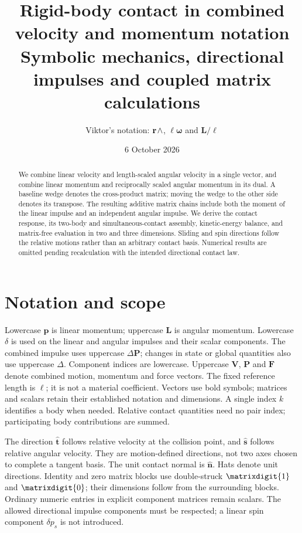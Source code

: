 \documentclass[11pt,a4paper]{article}
\title{Rigid-body contact in combined velocity and momentum notation\\\large Symbolic mechanics, directional impulses and coupled matrix calculations}
\author{Viktor's notation: $\mathord{\mathbf{r}\mkern2mu\wedge}$, $\ell\boldsymbol{\omega}$ and $\mathbf{L}/\ell$}
\date{6 October 2026}
\newcommand{\id}{\matrixdigit{1}}
\newcommand{\zmat}{\matrixdigit{0}}
\begin{document}
\maketitle
\begin{abstract}
We combine linear velocity and length-scaled angular velocity in a single vector, and combine linear momentum and reciprocally scaled angular momentum in its dual. A baseline wedge denotes the cross-product matrix; moving the wedge to the other side denotes its transpose. The resulting additive matrix chains include both the moment of the linear impulse and an independent angular impulse. We derive the contact response, its two-body and simultaneous-contact assembly, kinetic-energy balance, and matrix-free evaluation in two and three dimensions. Sliding and spin directions follow the relative motions rather than an arbitrary contact basis. Numerical results are omitted pending recalculation with the intended directional contact law.
\end{abstract}

\section{Notation and scope}
Lowercase $\mathbf{p}$ is linear momentum; uppercase $\mathbf{L}$ is angular momentum. Lowercase $\delta$ is used on the linear and angular impulses and their scalar components. The combined impulse uses uppercase $\Delta\mathbf{P}$; changes in state or global quantities also use uppercase $\Delta$. Component indices are lowercase. Uppercase $\mathbf{V}$, $\mathbf{P}$ and $\mathbf{F}$ denote combined motion, momentum and force vectors. The fixed reference length is $\ell$; it is not a material coefficient. Vectors use bold symbols; matrices and scalars retain their established notation and dimensions. A single index $k$ identifies a body when needed. Relative contact quantities need no pair index; participating body contributions are summed.

The direction $\hat{\mathbf{t}}$ follows relative velocity at the collision point, and $\hat{\mathbf{s}}$ follows relative angular velocity. They are motion-defined directions, not two axes chosen to complete a tangent basis. The unit contact normal is $\hat{\mathbf{n}}$. Hats denote unit directions. Identity and zero matrix blocks use double-struck $\id$ and $\zmat$; their dimensions follow from the surrounding blocks. Ordinary numeric entries in explicit component matrices remain scalars. The allowed directional impulse components must be respected; a linear spin component $\delta p_s$ is not introduced.
\end{document}
